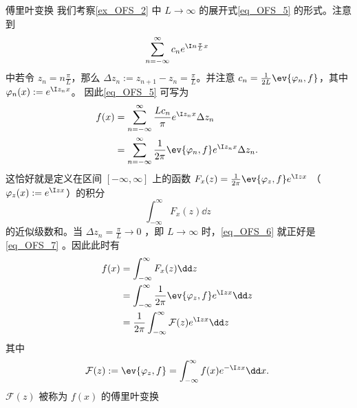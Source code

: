 \begin{example}{傅里叶变换}
我们考察\autoref{ex_OFS_2} 中 $L\rightarrow\infty$ 的展开式\autoref{eq_OFS_5} 的形式。注意到
\[
  \sum_{n=-\infty}^\infty c_ne^{\I n\frac{\pi}{L} x}~  
\]
中若令 $z_n=n\frac{\pi}{L}$，那么 $\Delta z_n:=z_{n+1}-z_n=\frac{\pi}{L}$。并注意 $c_n=\frac{1}{2L}\ev{\varphi_n,f}$，其中 $\varphi_n(x):=e^{\I z_n x}$。 因此\autoref{eq_OFS_5} 可写为
\begin{equation}\label{eq_OFS_6}
\begin{aligned}
f(x)&=\sum_{n=-\infty}^\infty \frac{Lc_n}{\pi}e^{\I z_n x}\Delta z_n\\
&=\sum_{n=-\infty}^\infty \frac{1}{2\pi}\ev{\varphi_n,f}e^{\I z_n x}\Delta z_n.
\end{aligned}~
\end{equation}
这恰好就是定义在区间 $[-\infty,\infty]$ 上的函数 $F_x(z)=\frac{1}{2\pi}\ev{\varphi_z,f}e^{\I z x}$ （$\varphi_z(x):=e^{\I z x}$）的积分
\begin{equation}\label{eq_OFS_7}
\int_{-\infty}^\infty F_x(z)\dd z~
\end{equation}
的近似级数和。当 $\Delta z_n=\frac{\pi}{L}\rightarrow0$ ，即 $L\rightarrow\infty$ 时，\autoref{eq_OFS_6} 就正好是\autoref{eq_OFS_7} 。因此此时有
\begin{equation}
\begin{aligned}
f(x)&=\int_{-\infty}^\infty F_x(z)\dd z\\
&=\int_{-\infty}^\infty\frac{1}{2\pi}\ev{\varphi_z,f}e^{\I z x}\dd z\\
&=\frac{1}{2\pi}\int_{-\infty}^\infty\mathcal F(z)e^{\I z x}\dd z\\
\end{aligned}~
\end{equation}
其中
\begin{equation}
\mathcal F(z):=\ev{\varphi_z,f}=\int_{-\infty}^\infty f(x)e^{-\I zx}\dd x.~
\end{equation}
$\mathcal F(z)$ 被称为 $f(x)$ 的傅里叶变换
\end{example}